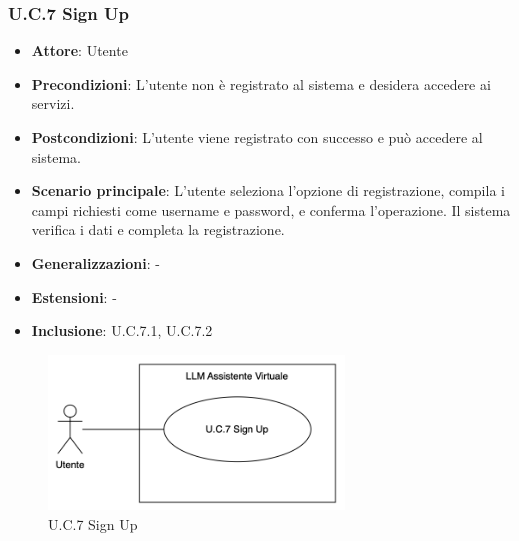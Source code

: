 \subsubsection{U.C.7 Sign Up}
\begin{itemize}
    \item \textbf{Attore}: Utente
    \item \textbf{Precondizioni}: L'utente non è registrato al sistema e desidera accedere ai servizi.
    \item \textbf{Postcondizioni}: L'utente viene registrato con successo e può accedere al sistema.
    \item \textbf{Scenario principale}: L'utente seleziona l'opzione di registrazione, compila i campi richiesti come username e password, e conferma l'operazione. Il sistema verifica i dati e completa la registrazione.
    \item \textbf{Generalizzazioni}: -
    \item \textbf{Estensioni}: -
    \item \textbf{Inclusione}: U.C.7.1, U.C.7.2
\end{itemize}
\begin{figure}[H]
    \centering
    \includegraphics[width=0.7\textwidth]{img/UC7.png}
    \caption{U.C.7 Sign Up}
\end{figure}
\newpage

